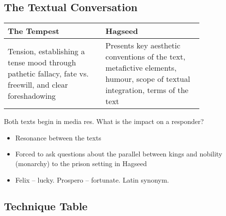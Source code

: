 	\subsection{The Textual Conversation}

		\def\arraystretch{1.5}
		\begin{table}[htbp]
			\centering
			\begin{tabular}{ p{0.4\linewidth} |p{0.4\linewidth} }
				The Tempest & Hagseed \\ \hline
				Tension, establishing a tense mood through pathetic fallacy, fate vs. freewill, and clear foreshadowing & Presents key aesthetic conventions of the text, metafictive elements, humour, scope of textual integration, terms of the text
			\end{tabular}
		\end{table}

		Both texts begin in media res. What is the impact on a responder?
		\begin{itemize}
			\item Resonance between the texts
			\item Forced to ask questions about the parallel between kings and nobility (monarchy) to the prison setting in Hagseed
			\item Felix – lucky. Prospero – fortunate. Latin synonym.
		\end{itemize}

	\subsection{Technique Table}
	
